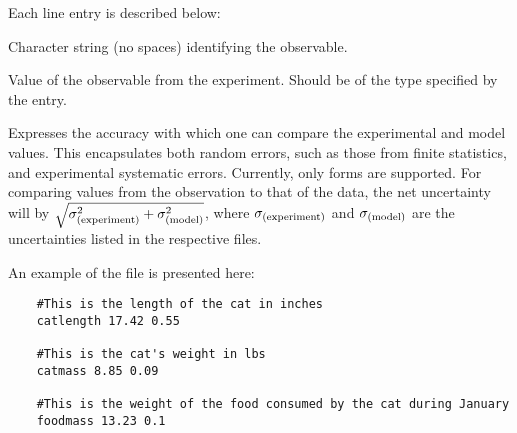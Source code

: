 
Each line entry is described below:

\begin{description}



\item {}

Character string (no spaces) identifying the observable.

\item {}

Value of the observable from the experiment. Should be of the type specified by the  entry.

\item {}

Expresses the accuracy with which one can compare the experimental and model values. This encapsulates both random errors, such as those from finite statistics, and experimental systematic errors. Currently, only  forms are supported. For comparing  values from the observation to that of the data, the net uncertainty will by $\sqrt{\sigma_{\rm(experiment)}^2+\sigma_{\rm(model)}^2}$, where $\sigma_{\rm(experiment)}$ and $\sigma_{\rm(model)}$ are the uncertainties listed in the respective  files.

\end{description}



An example of the  file is presented here:

\begin{verbatim}
    #This is the length of the cat in inches
    catlength 17.42 0.55

    #This is the cat's weight in lbs
    catmass 8.85 0.09

    #This is the weight of the food consumed by the cat during January
    foodmass 13.23 0.1
\end{verbatim}

